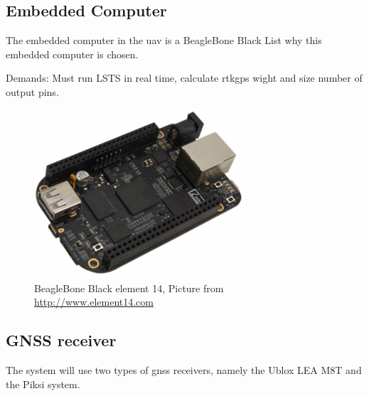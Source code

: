 \subsection{Embedded Computer}
The embedded computer in the \gls{uav} is a BeagleBone Black
List why this embedded computer is chosen. 

Demands: Must run LSTS in real time, calculate rtkgps wight and size number of output pins.
\begin{figure}[H]
	\centering
		\includegraphics[width=0.7\textwidth]{figs/BeagleBoneBlackE14.png}
		\caption{BeagleBone Black element 14, Picture from \url{http://www.element14.com}}
		\label{figure:BeagleBone}
\end{figure}
\subsection{GNSS receiver}
The system will use two types of \gls{gnss} receivers, namely the Ublox LEA M8T and the Piksi system. 
